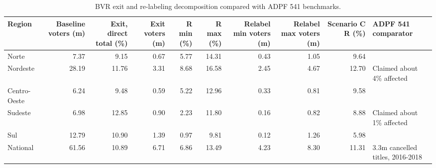 \begin{table}
\caption{BVR exit and re-labeling decomposition compared with ADPF 541 benchmarks.}
\label{tab:decomposition-adpf541}
\centering
\begin{adjustbox}{width=\textwidth}
\begin{tabular}{lrrrrrrrrl}
\toprule
Region & Baseline voters (m) & Exit, direct total (\%) & Exit voters (m) & R min (\%) & R max (\%) & Relabel min voters (m) & Relabel max voters (m) & Scenario C R (\%) & ADPF 541 comparator \\
\midrule
Norte & 7.37 & 9.15 & 0.67 & 5.77 & 14.31 & 0.43 & 1.05 & 9.64 &  \\
Nordeste & 28.19 & 11.76 & 3.31 & 8.68 & 16.58 & 2.45 & 4.67 & 12.70 & Claimed about 4\% affected \\
Centro-Oeste & 6.24 & 9.48 & 0.59 & 5.22 & 12.96 & 0.33 & 0.81 & 9.58 &  \\
Sudeste & 6.98 & 12.85 & 0.90 & 2.23 & 11.80 & 0.16 & 0.82 & 8.88 & Claimed about 1\% affected \\
Sul & 12.79 & 10.90 & 1.39 & 0.97 & 9.81 & 0.12 & 1.26 & 5.98 &  \\
National & 61.56 & 10.89 & 6.71 & 6.86 & 13.49 & 4.23 & 8.30 & 11.31 & 3.3m cancelled titles, 2016-2018 \\
\bottomrule
\end{tabular}
\end{adjustbox}
\end{table}
